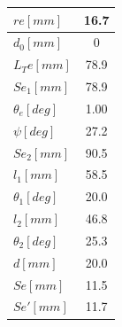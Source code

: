 \begin{table}[htbp]
\begin{minipage}{0.5\hsize}
\begin{tabular}{|l|c|}
  $re[mm]        $ & 16.7                         \\ \hline
  $d_0[mm]       $ & 0                            \\ \hline
  $L_Te[mm]      $ & 78.9                         \\ \hline
  $Se_1[mm]      $ & 78.9                         \\ \hline
  $\theta_e[deg] $ & 1.00                         \\ \hline
  $\psi[deg]     $ & 27.2                         \\ \hline
  $Se_2[mm]      $ & 90.5                         \\ \hline
  $l_1[mm]       $ & 58.5                         \\ \hline
  $\theta_1[deg] $ & 20.0                         \\ \hline
  $l_2[mm]       $ & 46.8                         \\ \hline
  $\theta_2[deg] $ & 25.3                         \\ \hline
  $d[mm]         $ & 20.0                         \\ \hline
  $Se[mm]        $ & 11.5                         \\ \hline
  $Se'[mm]       $ & 11.7                         \\ \hline
  \end{tabular}
\end{minipage}
\end{table}